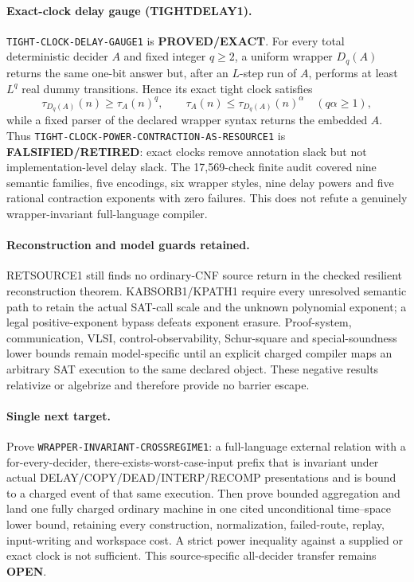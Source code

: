 \documentclass[11pt]{article}
\begin{document}
\paragraph{Exact-clock delay gauge (TIGHTDELAY1).}
\texttt{TIGHT-CLOCK-DELAY-GAUGE1} is \textbf{PROVED/EXACT}.  For every total
deterministic decider $A$ and fixed integer $q\ge2$, a uniform wrapper
$D_q(A)$ returns the same one-bit answer but, after an $L$-step run of $A$,
performs at least $L^q$ real dummy transitions.  Hence its exact tight clock
satisfies
\[
 \tau_{D_q(A)}(n)\ge \tau_A(n)^q,
 \qquad
 \tau_A(n)\le \tau_{D_q(A)}(n)^\alpha\quad(q\alpha\ge1),
\]
while a fixed parser of the declared wrapper syntax returns the embedded $A$.
Thus \texttt{TIGHT-CLOCK-POWER-CONTRACTION-AS-RESOURCE1} is
\textbf{FALSIFIED/RETIRED}: exact clocks remove annotation slack but not
implementation-level delay slack.  The 17,569-check finite audit covered nine
semantic families, five encodings, six wrapper styles, nine delay powers and
five rational contraction exponents with zero failures.  This does not refute
a genuinely wrapper-invariant full-language compiler.

\paragraph{Reconstruction and model guards retained.}
RETSOURCE1 still finds no ordinary-CNF source return in the checked resilient
reconstruction theorem.  KABSORB1/KPATH1 require every unresolved semantic
path to retain the actual SAT-call scale and the unknown polynomial exponent;
a legal positive-exponent bypass defeats exponent erasure.  Proof-system,
communication, VLSI, control-observability, Schur-square and special-soundness
lower bounds remain model-specific until an explicit charged compiler maps an
arbitrary SAT execution to the same declared object.  These negative results
relativize or algebrize and therefore provide no barrier escape.

\paragraph{Single next target.}
Prove \texttt{WRAPPER-INVARIANT-CROSSREGIME1}: a full-language external
relation with a for-every-decider, there-exists-worst-case-input prefix that
is invariant under actual DELAY/COPY/DEAD/INTERP/RECOMP presentations and is
bound to a charged event of that same execution.  Then prove bounded
aggregation and land one fully charged ordinary machine in one cited
unconditional time--space lower bound, retaining every construction,
normalization, failed-route, replay, input-writing and workspace cost.  A
strict power inequality against a supplied or exact clock is not sufficient.
This source-specific all-decider transfer remains \textbf{OPEN}.
\end{document}
